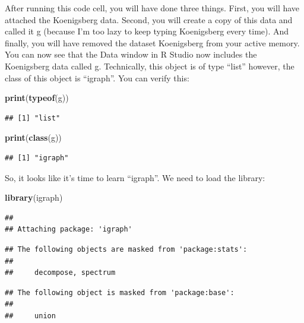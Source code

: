 \documentclass[
]{article}
\newenvironment{Shaded}{\begin{snugshade}}{\end{snugshade}}
\newcommand{\FunctionTok}[1]{\textcolor[rgb]{0.13,0.29,0.53}{\textbf{#1}}}
\newcommand{\NormalTok}[1]{#1}
\begin{document}
After running this code cell, you will have done three things. First,
you will have attached the Koenigsberg data. Second, you will create a
copy of this data and called it g (because I'm too lazy to keep typing
Koenigsberg every time). And finally, you will have removed the dataset
Koenigsberg from your active memory. You can now see that the Data
window in R Studio now includes the Koenigsberg data called g.
Technically, this object is of type ``list'' however, the class of this
object is ``igraph''. You can verify this:

\begin{Shaded}
\begin{Highlighting}[]
\FunctionTok{print}\NormalTok{(}\FunctionTok{typeof}\NormalTok{(g))}
\end{Highlighting}
\end{Shaded}

\begin{verbatim}
## [1] "list"
\end{verbatim}

\begin{Shaded}
\begin{Highlighting}[]
\FunctionTok{print}\NormalTok{(}\FunctionTok{class}\NormalTok{(g))}
\end{Highlighting}
\end{Shaded}

\begin{verbatim}
## [1] "igraph"
\end{verbatim}

So, it looks like it's time to learn ``igraph''. We need to load the
library:

\begin{Shaded}
\begin{Highlighting}[]
\FunctionTok{library}\NormalTok{(igraph)}
\end{Highlighting}
\end{Shaded}

\begin{verbatim}
## 
## Attaching package: 'igraph'
\end{verbatim}

\begin{verbatim}
## The following objects are masked from 'package:stats':
## 
##     decompose, spectrum
\end{verbatim}

\begin{verbatim}
## The following object is masked from 'package:base':
## 
##     union
\end{verbatim}
\end{document}
